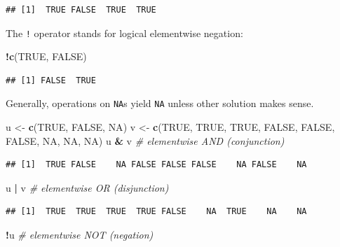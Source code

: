 \documentclass[10pt,b5paper,krantz1]{krantz}
\newenvironment{Shaded}{\begin{snugshade}}{\end{snugshade}}
\newcommand{\CommentTok}[1]{\textcolor[rgb]{0.37,0.37,0.37}{\textit{#1}}}
\newcommand{\KeywordTok}[1]{\textcolor[rgb]{0.27,0.27,0.27}{\textbf{#1}}}
\newcommand{\NormalTok}[1]{#1}
\newcommand{\OperatorTok}[1]{\textcolor[rgb]{0.43,0.43,0.43}{\textbf{#1}}}
\newcommand{\OtherTok}[1]{\textcolor[rgb]{0.37,0.37,0.37}{#1}}
\newcommand{\StringTok}[1]{\textcolor[rgb]{0.5,0.5,0.5}{#1}}
\begin{document}
\begin{verbatim}
## [1]  TRUE FALSE  TRUE  TRUE
\end{verbatim}

The \texttt{!} operator stands for logical elementwise negation:

\begin{Shaded}
\begin{Highlighting}[]
\OperatorTok{!}\KeywordTok{c}\NormalTok{(}\OtherTok{TRUE}\NormalTok{, }\OtherTok{FALSE}\NormalTok{)}
\end{Highlighting}
\end{Shaded}

\begin{verbatim}
## [1] FALSE  TRUE
\end{verbatim}

Generally, operations on \texttt{NA}s yield \texttt{NA} unless other solution
makes sense.

\begin{Shaded}
\begin{Highlighting}[]
\NormalTok{u <-}\StringTok{ }\KeywordTok{c}\NormalTok{(}\OtherTok{TRUE}\NormalTok{, }\OtherTok{FALSE}\NormalTok{, }\OtherTok{NA}\NormalTok{)}
\NormalTok{v <-}\StringTok{ }\KeywordTok{c}\NormalTok{(}\OtherTok{TRUE}\NormalTok{, }\OtherTok{TRUE}\NormalTok{, }\OtherTok{TRUE}\NormalTok{, }\OtherTok{FALSE}\NormalTok{, }\OtherTok{FALSE}\NormalTok{, }\OtherTok{FALSE}\NormalTok{, }\OtherTok{NA}\NormalTok{, }\OtherTok{NA}\NormalTok{, }\OtherTok{NA}\NormalTok{)}
\NormalTok{u }\OperatorTok{&}\StringTok{ }\NormalTok{v }\CommentTok{# elementwise AND (conjunction)}
\end{Highlighting}
\end{Shaded}

\begin{verbatim}
## [1]  TRUE FALSE    NA FALSE FALSE FALSE    NA FALSE    NA
\end{verbatim}

\begin{Shaded}
\begin{Highlighting}[]
\NormalTok{u }\OperatorTok{|}\StringTok{ }\NormalTok{v }\CommentTok{# elementwise OR  (disjunction)}
\end{Highlighting}
\end{Shaded}

\begin{verbatim}
## [1]  TRUE  TRUE  TRUE  TRUE FALSE    NA  TRUE    NA    NA
\end{verbatim}

\begin{Shaded}
\begin{Highlighting}[]
\OperatorTok{!}\NormalTok{u    }\CommentTok{# elementwise NOT (negation)}
\end{Highlighting}
\end{Shaded}
\end{document}
